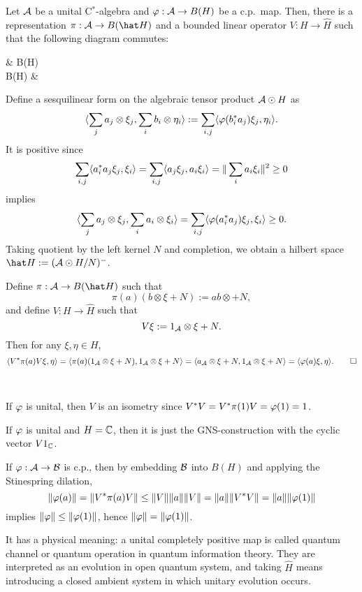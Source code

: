 \documentclass{../../small}
\begin{document}
\begin{thm}
Let $\mathcal{A}$ be a unital C$^*$-algebra and $\varphi:\mathcal{A}\to B(H)$ be a c.p.~map.
Then, there is a representation $\pi:\cA\to B(\hat H)$ and a bounded linear operator $V:H\to\hat H$ such that the following diagram commutes:
\begin{cd}
\cA {}  & B(H) \\
B(\hat H)  &
\end{cd}
\end{thm}
\begin{pf}
Define a sesquilinear form on the algebraic tensor product $\mathcal{A}\odot H$ as
\[\langle\sum_ja_j\otimes\xi_j,\sum_ib_i\otimes\eta_i\rangle:=\sum_{i,j}\langle\varphi(b_i^*a_j)\xi_j,\eta_i\rangle.\]
It is positive since
\[\sum_{i,j}\langle a_i^*a_j\xi_j,\xi_i\rangle=\sum_{i,j}\langle a_j\xi_j,a_i\xi_i\rangle=\|\sum_ia_i\xi_i\|^2\ge0\]
implies
\[\langle\sum_ja_j\otimes\xi_j,\sum_ia_i\otimes\xi_i\rangle=\sum_{i,j}\langle\varphi(a_i^*a_j)\xi_j,\xi_i\rangle\ge0.\]
Taking quotient by the left kernel $N$ and completion, we obtain a hilbert space $\hat H:=(\cA\odot H/N)^-$.

Define $\pi:\cA\to B(\hat H)$ such that
\[\pi(a)(b\otimes\xi+N):=ab\otimes+N,\]
and define $V:H\to\hat H$ such that
\[V\xi:=1_{\mathcal{A}}\otimes\xi+N.\]
Then for any $\xi,\eta\in H$,
\[\langle V^*\pi(a)V\xi,\eta\rangle=\langle\pi(a)(1_{\mathcal{A}}\otimes\xi+N),1_{\mathcal{A}}\otimes\xi+N\rangle=\langle a_{\mathcal{A}}\otimes\xi+N,1_{\mathcal{A}}\otimes\xi+N\rangle=\langle\varphi(a)\xi,\eta\rangle.\qedhere\]
\end{pf}

\begin{rmk}\,
\begin{parts}
\item If $\varphi$ is unital, then $V$ is an isometry since $V^*V=V^*\pi(1)V=\varphi(1)=1$.
\item If $\varphi$ is unital and $H=\mathbb{C}$, then it is just the GNS-construction with the cyclic vector $V1_{\mathbb{C}}$.
\item If $\varphi:\mathcal{A}\to\mathcal{B}$ is c.p., then by embedding $\mathcal{B}$ into $B(H)$ and applying the Stinespring dilation,
\[\|\varphi(a)\|=\|V^*\pi(a)V\|\le\|V\|\|a\|\|V\|=\|a\|\|V^*V\|=\|a\|\|\varphi(1)\|\]
implies $\|\varphi\|\le\|\varphi(1)\|$, hence $\|\varphi\|=\|\varphi(1)\|$.
\item It has a physical meaning: a unital completely positive map is called quantum channel or quantum operation in quantum information theory. They are interpreted as an evolution in open quantum system, and taking $\hat H$ means introducing a closed ambient system in which unitary evolution occurs.
\end{parts}
\end{rmk}
\end{document}

